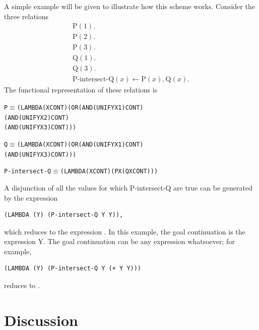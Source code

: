A simple example will be given to illustrate how this scheme works. Consider the
three relations
\[
\begin{array}{l}
\mathrm{P}(1).\\
\mathrm{P}(2).\\
\mathrm{P}(3).\\[0.5em]
\mathrm{Q}(1).\\
\mathrm{Q}(3).\\[0.5em]
\text{P-intersect-Q}(x)\leftarrow \mathrm{P}(x),\mathrm{Q}(x).
\end{array}
\]
The functional representation of these relations is
\par\smallskip\noindent\begin{minipage}{\linewidth}
\begin{alltt}
P \(\equiv\) (LAMBDA (X CONT) (OR (AND (UNIFY X 1) CONT)
                         (AND (UNIFY X 2) CONT)
                         (AND (UNIFY X 3) CONT)))
\end{alltt}
\end{minipage}\par\bigskip
\noindent\begin{minipage}{\linewidth}
\begin{alltt}
Q \(\equiv\) (LAMBDA (X CONT) (OR (AND (UNIFY X 1) CONT)
                         (AND (UNIFY X 3) CONT)))
\end{alltt}
\end{minipage}\par\bigskip
\noindent\begin{minipage}{\linewidth}
\begin{alltt}
P-intersect-Q \(\equiv\) (LAMBDA (X CONT) (P X (Q X CONT)))
\end{alltt}
\end{minipage}\par\smallskip
A disjunction of all the values for which P-intersect-Q are true can be
generated by the expression
\begin{verbatim}
(LAMBDA (Y) (P-intersect-Q Y Y)),
\end{verbatim}
which reduces to the expression . In this example, the goal
continuation is the expression Y. The goal continuation can be any expression
whatsoever; for example,
\begin{verbatim}
(LAMBDA (Y) (P-intersect-Q Y (+ Y Y)))
\end{verbatim}
reduces to .

\section{Discussion}

